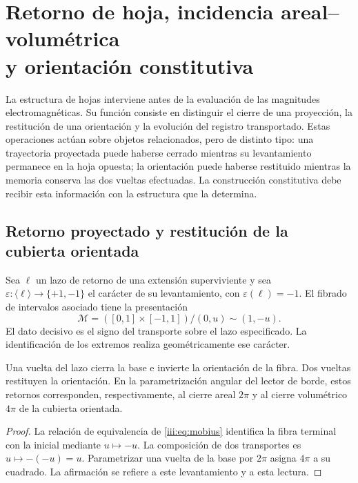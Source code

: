 \section[Retorno de hoja, incidencia areal--volumétrica y orientación constitutiva]{Retorno de hoja, incidencia areal--volumétrica\\y orientación constitutiva}
\label{iii:sec:hojas}
\label{nuclear:constitutiva-antecedente}

La estructura de hojas interviene antes de la evaluación de las magnitudes
electromagnéticas. Su función consiste en distinguir el cierre de una proyección,
la restitución de una orientación y la evolución del registro transportado.
Estas operaciones actúan sobre objetos relacionados, pero de distinto tipo: una
trayectoria proyectada puede haberse cerrado mientras su levantamiento permanece
en la hoja opuesta; la orientación puede haberse restituido mientras la memoria
conserva las dos vueltas efectuadas. La construcción constitutiva debe recibir
esta información con la estructura que la determina.

\subsection{Retorno proyectado y restitución de la cubierta orientada}

Sea $\ell$ un lazo de retorno de una extensión superviviente y sea
$\varepsilon:\langle\ell\rangle\to\{+1,-1\}$ el carácter de su
levantamiento, con $\varepsilon(\ell)=-1$. El fibrado de intervalos asociado
tiene la presentación
\begin{equation}
 \mathcal M=([0,1]\times[-1,1])/{(0,u)\sim(1,-u)}.
 \label{iii:eq:mobius}
\end{equation}
El dato decisivo es el signo del transporte sobre el lazo especificado. La
identificación de los extremos realiza geométricamente ese carácter.

\begin{proposition}
Una vuelta del lazo cierra la base e invierte la orientación de la fibra. Dos
vueltas restituyen la orientación. En la parametrización angular del lector de
borde, estos retornos corresponden, respectivamente, al cierre areal $2\pi$ y
al cierre volumétrico $4\pi$ de la cubierta orientada.
\end{proposition}
\begin{proof}
La relación de equivalencia de \eqref{iii:eq:mobius} identifica la fibra terminal
con la inicial mediante $u\mapsto-u$. La composición de dos transportes es
$u\mapsto-(-u)=u$. Parametrizar una vuelta de la base por $2\pi$ asigna $4\pi$
a su cuadrado. La afirmación se refiere a este levantamiento y a esta lectura.
\end{proof}

